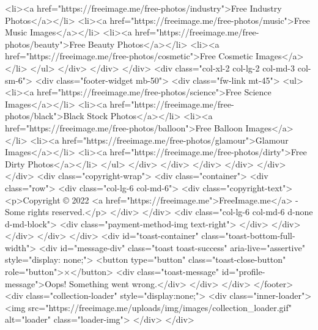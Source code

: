 <li><a href="https://freeimage.me/free-photos/industry">Free Industry Photos</a></li>
<li><a href="https://freeimage.me/free-photos/music">Free Music Images</a></li>
<li><a href="https://freeimage.me/free-photos/beauty">Free Beauty Photos</a></li>
<li><a href="https://freeimage.me/free-photos/cosmetic">Free Cosmetic Images</a></li>
</ul>
</div>
</div>
</div>
<div class="col-xl-2 col-lg-2 col-md-3 col-sm-6">
<div class="footer-widget mb-50">
<div class="fw-link mt-45">
<ul>
<li><a href="https://freeimage.me/free-photos/science">Free Science Images</a></li>
<li><a href="https://freeimage.me/free-photos/black">Black Stock Photos</a></li>
<li><a href="https://freeimage.me/free-photos/balloon">Free Balloon Images</a></li>
<li><a href="https://freeimage.me/free-photos/glamour">Glamour Images</a></li>
<li><a href="https://freeimage.me/free-photos/dirty">Free Dirty Photos</a></li>
</ul>
</div>
</div>
</div>
</div>
</div>
</div>
<div class="copyright-wrap">
<div class="container">
<div class="row">
<div class="col-lg-6 col-md-6">
<div class="copyright-text">
<p>Copyright © 2022 <a href="https://freeimage.me">FreeImage.me</a> - Some rights reserved.</p>
</div>
</div>
<div class="col-lg-6 col-md-6 d-none d-md-block">
<div class="payment-method-img text-right">
</div>
</div>
</div>
</div>
</div>
<div id="toast-container" class="toast-bottom-full-width">
<div id="message-div" class="toast toast-success" aria-live="assertive" style="display: none;">
<button type="button" class="toast-close-button" role="button">×</button>
 <div class="toast-message" id="profile-message">Oops! Something went wrong.</div>
</div>
</div>
</footer>
<div class="collection-loader" style="display:none;">
<div class="inner-loader">
<img src="https://freeimage.me/uploads/img/images/collection_loader.gif" alt="loader" class="loader-img">
</div>
</div>

